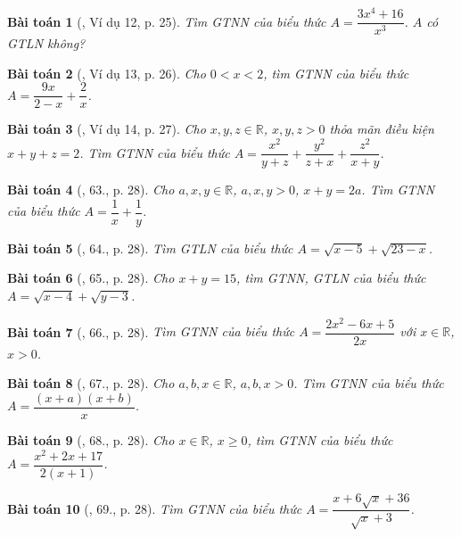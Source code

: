 \documentclass{article}
\newtheorem{baitoan}{Bài toán}
\begin{document}
\begin{baitoan}[\cite{Tuyen_Toan_9}, Ví dụ 12, p. 25]
	Tìm {\rm GTNN} của biểu thức $A = \dfrac{3x^4 + 16}{x^3}$. $A$ có {\rm GTLN} không?
\end{baitoan}

\begin{baitoan}[\cite{Tuyen_Toan_9}, Ví dụ 13, p. 26]
	Cho $0 < x < 2$, tìm {\rm GTNN} của biểu thức $A = \dfrac{9x}{2 - x} + \dfrac{2}{x}$. 
\end{baitoan}

\begin{baitoan}[\cite{Tuyen_Toan_9}, Ví dụ 14, p. 27]
	Cho $x,y,z\in\mathbb{R}$, $x,y,z > 0$ thỏa mãn điều kiện $x + y + z = 2$. Tìm {\rm GTNN} của biểu thức $A = \dfrac{x^2}{y + z} + \dfrac{y^2}{z + x} + \dfrac{z^2}{x + y}$.
\end{baitoan}

\begin{baitoan}[\cite{Tuyen_Toan_9}, 63., p. 28]
	Cho $a,x,y\in\mathbb{R}$, $a,x,y > 0$, $x + y = 2a$. Tìm {\rm GTNN} của biểu thức $A = \dfrac{1}{x} + \dfrac{1}{y}$.
\end{baitoan}

\begin{baitoan}[\cite{Tuyen_Toan_9}, 64., p. 28]
	Tìm {\rm GTLN} của biểu thức $A = \sqrt{x - 5} + \sqrt{23 - x}$.
\end{baitoan}

\begin{baitoan}[\cite{Tuyen_Toan_9}, 65., p. 28]
	Cho $x + y = 15$, tìm {\rm GTNN}, {\rm GTLN} của biểu thức $A = \sqrt{x - 4} + \sqrt{y - 3}$.
\end{baitoan}

\begin{baitoan}[\cite{Tuyen_Toan_9}, 66., p. 28]
	Tìm {\rm GTNN} của biểu thức $A = \dfrac{2x^2 - 6x + 5}{2x}$ với $x\in\mathbb{R}$, $x > 0$.
\end{baitoan}

\begin{baitoan}[\cite{Tuyen_Toan_9}, 67., p. 28]
	Cho $a,b,x\in\mathbb{R}$, $a,b,x > 0$. Tìm {\rm GTNN} của biểu thức $A = \dfrac{(x + a)(x + b)}{x}$.
\end{baitoan}

\begin{baitoan}[\cite{Tuyen_Toan_9}, 68., p. 28]
	Cho $x\in\mathbb{R}$, $x\ge0$, tìm {\rm GTNN} của biểu thức $A = \dfrac{x^2 + 2x + 17}{2(x + 1)}$.
\end{baitoan}

\begin{baitoan}[\cite{Tuyen_Toan_9}, 69., p. 28]
	Tìm {\rm GTNN} của biểu thức $A = \dfrac{x + 6\sqrt{x} + 36}{\sqrt{x} + 3}$.
\end{baitoan}
\end{document}

